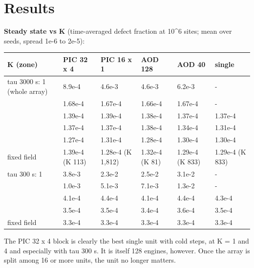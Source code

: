 \hypertarget{3-results}{%
\section{Results}\label{concurrency-3-results}}

\textbf{Steady state vs K} (time-averaged defect fraction at 10\^{}6
sites; mean over seeds, spread 1e-6 to 2e-5):

{\footnotesize
\begin{longtable}[]{@{}>{\raggedright\arraybackslash}p{0.221\dimexpr(\linewidth-12\tabcolsep)\relax}>{\raggedright\arraybackslash}p{0.156\dimexpr(\linewidth-12\tabcolsep)\relax}>{\raggedright\arraybackslash}p{0.156\dimexpr(\linewidth-12\tabcolsep)\relax}>{\raggedright\arraybackslash}p{0.156\dimexpr(\linewidth-12\tabcolsep)\relax}>{\raggedright\arraybackslash}p{0.156\dimexpr(\linewidth-12\tabcolsep)\relax}>{\raggedright\arraybackslash}p{0.156\dimexpr(\linewidth-12\tabcolsep)\relax}@{}}
\toprule\noalign{}
K (zone) & PIC 32 x 4 & PIC 16 x 1 & AOD 128 & AOD 40 & single \\
\midrule\noalign{}
\endhead
\bottomrule\noalign{}
\endlastfoot
tau 3000 s: 1 (whole array) & 8.9e-4 & 4.6e-3 & 4.6e-3 & 6.2e-3 & - \\
4 & 1.68e-4 & 1.67e-4 & 1.66e-4 & 1.67e-4 & - \\
16 & 1.39e-4 & 1.39e-4 & 1.38e-4 & 1.37e-4 & 1.37e-4 \\
64 & 1.37e-4 & 1.37e-4 & 1.38e-4 & 1.34e-4 & 1.31e-4 \\
252 & 1.27e-4 & 1.31e-4 & 1.28e-4 & 1.30e-4 & 1.30e-4 \\
fixed field & 1.39e-4 (K 113) & 1.28e-4 (K 1,812) & 1.32e-4 (K 81) &
1.29e-4 (K 833) & 1.29e-4 (K 833) \\
tau 300 s: 1 & 3.8e-3 & 2.3e-2 & 2.5e-2 & 3.1e-2 & - \\
4 & 1.0e-3 & 5.1e-3 & 7.1e-3 & 1.3e-2 & - \\
16 & 4.1e-4 & 4.4e-4 & 4.1e-4 & 4.4e-4 & 4.3e-4 \\
64 & 3.5e-4 & 3.5e-4 & 3.4e-4 & 3.6e-4 & 3.5e-4 \\
fixed field & 3.3e-4 & 3.3e-4 & 3.3e-4 & 3.3e-4 & 3.3e-4 \\
\end{longtable}
}

The PIC 32 x 4 block is clearly the best single unit with cold steps, at
K = 1 and 4 and especially with tau 300 s. It is itself 128 engines,
however. Once the array is split among 16 or more units, the unit no
longer matters.

